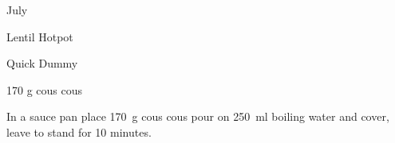 \begin{menu}{July}
\begin{recipe}{2}{Lentil Hotpot}
\begin{instructions}
    \end{instructions}
    \end{recipe}%
  
    \begin{recipe}{1}{Quick Dummy}%
		\begin{ingredients}
		170 g cous cous  \\
	
		\end{ingredients}
	
	
    \begin{instructions}
    \item 
    In a
    sauce pan
    place
    170~g  cous cous
    pour on
    250~ml  boiling water
    and cover, leave to stand for 10 minutes.
  
    \end{instructions}
    \end{recipe}%
  
    \clearpage
    \end{menu}
	
